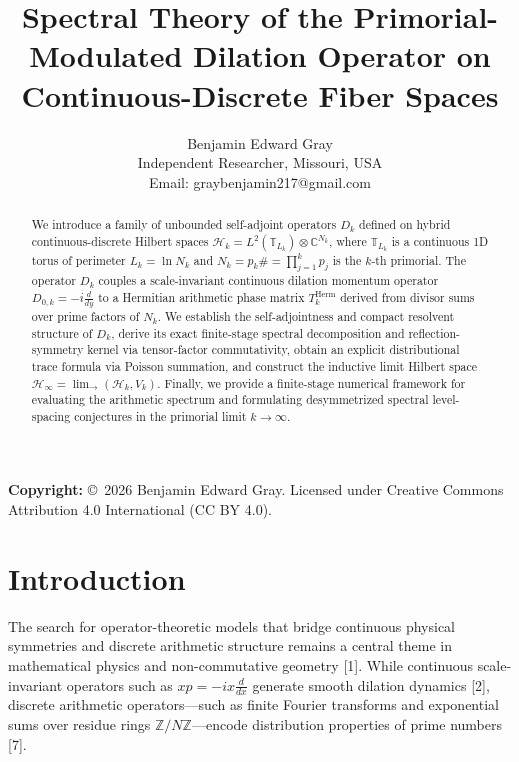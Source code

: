 \documentclass[11pt, a4paper]{article}
\begin{document}
\title{Spectral Theory of the Primorial-Modulated Dilation Operator on Continuous-Discrete Fiber Spaces}
\author{Benjamin Edward Gray \\ Independent Researcher, Missouri, USA \\ Email: graybenjamin217@gmail.com}
\date{}
\maketitle

\begin{abstract}
We introduce a family of unbounded self-adjoint operators $D_k$ defined on hybrid continuous-discrete Hilbert spaces $\mathcal{H}_k = L^2(\mathbb{T}_{L_k}) \otimes \mathbb{C}^{N_k}$, where $\mathbb{T}_{L_k}$ is a continuous 1D torus of perimeter $L_k = \ln N_k$ and $N_k = p_k\# = \prod_{j=1}^k p_j$ is the $k$-th primorial. The operator $D_k$ couples a scale-invariant continuous dilation momentum operator $D_{0,k} = -i\frac{d}{dy}$ to a Hermitian arithmetic phase matrix $T_k^{\mathrm{Herm}}$ derived from divisor sums over prime factors of $N_k$. We establish the self-adjointness and compact resolvent structure of $D_k$, derive its exact finite-stage spectral decomposition and reflection-symmetry kernel via tensor-factor commutativity, obtain an explicit distributional trace formula via Poisson summation, and construct the inductive limit Hilbert space $\mathcal{H}_\infty = \lim_{\rightarrow}(\mathcal{H}_k, V_k)$. Finally, we provide a finite-stage numerical framework for evaluating the arithmetic spectrum and formulating desymmetrized spectral level-spacing conjectures in the primorial limit $k \rightarrow \infty$.
\end{abstract}

\noindent\textbf{Copyright:} \copyright\ 2026 Benjamin Edward Gray. Licensed under Creative Commons Attribution 4.0 International (CC BY 4.0).

\section{Introduction}
The search for operator-theoretic models that bridge continuous physical symmetries and discrete arithmetic structure remains a central theme in mathematical physics and non-commutative geometry [1]. While continuous scale-invariant operators such as $xp = -ix\frac{d}{dx}$ generate smooth dilation dynamics [2], discrete arithmetic operators---such as finite Fourier transforms and exponential sums over residue rings $\mathbb{Z}/N\mathbb{Z}$---encode distribution properties of prime numbers [7].
\end{document}
